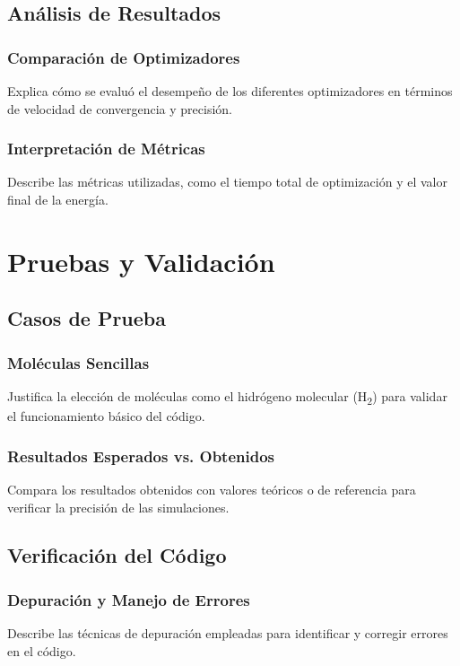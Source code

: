 \subsection{Análisis de Resultados}

\subsubsection{Comparación de Optimizadores}
Explica cómo se evaluó el desempeño de los diferentes optimizadores en términos de velocidad de convergencia y precisión.

\subsubsection{Interpretación de Métricas}
Describe las métricas utilizadas, como el tiempo total de optimización y el valor final de la energía.

\section{Pruebas y Validación}

\subsection{Casos de Prueba}

\subsubsection{Moléculas Sencillas}
Justifica la elección de moléculas como el hidrógeno molecular (H\textsubscript{2}) para validar el funcionamiento básico del código.

\subsubsection{Resultados Esperados vs. Obtenidos}
Compara los resultados obtenidos con valores teóricos o de referencia para verificar la precisión de las simulaciones.

\subsection{Verificación del Código}

\subsubsection{Depuración y Manejo de Errores}
Describe las técnicas de depuración empleadas para identificar y corregir errores en el código.


